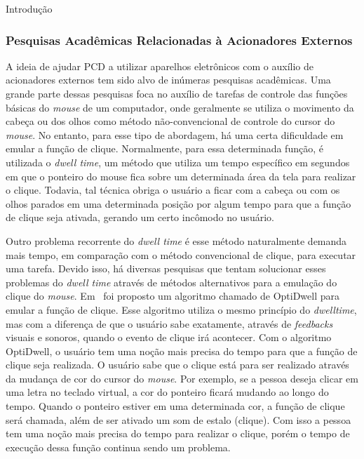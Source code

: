 \begin{chapter}{Introdução}
\subsubsection {Pesquisas Acadêmicas Relacionadas à Acionadores Externos}

A ideia de ajudar PCD a utilizar aparelhos eletrônicos com o auxílio de
acionadores externos tem sido alvo de inúmeras pesquisas acadêmicas. Uma grande
parte dessas pesquisas foca no auxílio de tarefas de controle das funções
básicas do \textit{mouse} de um computador, onde geralmente se utiliza o
movimento da cabeça ou dos olhos como método não-convencional de controle do
cursor do \textit{mouse}. No entanto, para esse tipo de abordagem, há uma certa
dificuldade em emular a função de clique.  Normalmente, para essa determinada
função,  é utilizada o \textit{dwell time}, um método que utiliza um tempo
específico em segundos em que o ponteiro do mouse fica sobre um determinada área
da tela para realizar  o clique. Todavia, tal técnica obriga o usuário a ficar
com a cabeça ou com os olhos parados em uma determinada posição por algum tempo
para que a função de clique seja ativada, gerando um certo incômodo no usuário.

Outro problema recorrente do \textit{dwell time} é esse método naturalmente
demanda mais tempo, em comparação com o método convencional de clique, 
para executar uma tarefa. Devido isso,
há diversas pesquisas que tentam solucionar esses problemas do \textit{dwell
time} através de métodos alternativos para a emulação do clique do
\textit{mouse}.  Em~\cite{Aanand18} foi proposto um algoritmo chamado de
OptiDwell para emular a função de clique.  Esse algoritmo utiliza o mesmo
princípio do \textit{dwelltime}, mas com a diferença de que o usuário sabe
exatamente, através de \textit{feedbacks} visuais e sonoros, quando o evento de
clique irá acontecer.  Com o algoritmo OptiDwell, o usuário tem uma noção mais
precisa do tempo para que a função de clique seja realizada. O usuário sabe que
o clique está para ser realizado através da mudança de cor do cursor do
\textit{mouse}. Por exemplo, se a pessoa deseja clicar em uma letra no teclado
virtual, a cor do ponteiro ficará mudando ao longo do tempo. Quando o ponteiro
estiver em uma determinada cor, a função de clique será chamada, além de ser
ativado um som de estalo (clique). Com isso a pessoa tem uma noção mais precisa do
tempo para realizar o clique, porém o tempo de execução dessa função continua 
sendo um problema.


\end{chapter}
